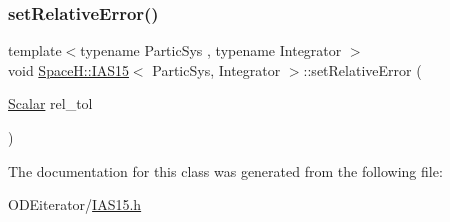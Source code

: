 \mbox{\label{class_space_h_1_1_i_a_s15_a05a4ea53a8d39fc77fc761f7a8a9864d}} 
\subsubsection{\texorpdfstring{set\+Relative\+Error()}{setRelativeError()}}
{\footnotesize\ttfamily template$<$typename Partic\+Sys , typename Integrator $>$ \\
void \mbox{\hyperlink{class_space_h_1_1_i_a_s15}{Space\+H\+::\+I\+A\+S15}}$<$ Partic\+Sys, Integrator $>$\+::set\+Relative\+Error (\begin{DoxyParamCaption}\item[{\mbox{\hyperlink{class_space_h_1_1_i_a_s15_ac4ee5f40852d7b500ca50084eb35b012}{Scalar}}}]{rel\+\_\+tol }\end{DoxyParamCaption})\hspace{0.3cm}{\ttfamily [inline]}}



The documentation for this class was generated from the following file\+:\begin{DoxyCompactItemize}
\item 
O\+D\+Eiterator/\mbox{\hyperlink{_i_a_s15_8h}{I\+A\+S15.\+h}}\end{DoxyCompactItemize}
